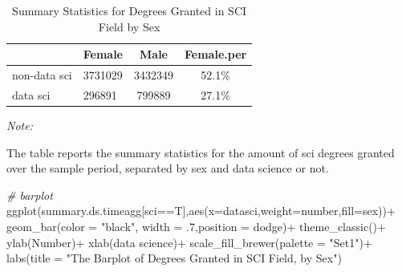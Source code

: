 \documentclass[
  12pt,
]{article}
\newenvironment{Shaded}{\begin{snugshade}}{\end{snugshade}}
\newcommand{\AttributeTok}[1]{\textcolor[rgb]{0.77,0.63,0.00}{#1}}
\newcommand{\CommentTok}[1]{\textcolor[rgb]{0.56,0.35,0.01}{\textit{#1}}}
\newcommand{\DecValTok}[1]{\textcolor[rgb]{0.00,0.00,0.81}{#1}}
\newcommand{\FunctionTok}[1]{\textcolor[rgb]{0.00,0.00,0.00}{#1}}
\newcommand{\NormalTok}[1]{#1}
\newcommand{\SpecialCharTok}[1]{\textcolor[rgb]{0.00,0.00,0.00}{#1}}
\newcommand{\StringTok}[1]{\textcolor[rgb]{0.31,0.60,0.02}{#1}}
\begin{document}
\begin{table}[H]

\caption{\label{tab:unnamed-chunk-11}Summary Statistics for Degrees Granted in SCI Field by Sex}
\centering
\begin{threeparttable}
\begin{tabular}[t]{llcc}
\toprule
  & Female & Male & Female.per\\
\midrule
non-data sci & 3731029 & 3432349 & 52.1\%\\
data sci & 296891 & 799889 & 27.1\%\\
\bottomrule
\end{tabular}
\begin{tablenotes}
\item \textit{Note: } 
\item The table reports the summary statistics for the amount of sci degrees granted over the sample period, separated by sex and data science or not.
\end{tablenotes}
\end{threeparttable}
\end{table}

\begin{Shaded}
\begin{Highlighting}[]
\CommentTok{\# barplot}
\FunctionTok{ggplot}\NormalTok{(summary.ds.timeagg[sci}\SpecialCharTok{==}\NormalTok{T],}\FunctionTok{aes}\NormalTok{(}\AttributeTok{x=}\NormalTok{datasci,}\AttributeTok{weight=}\NormalTok{number,}\AttributeTok{fill=}\NormalTok{sex))}\SpecialCharTok{+}
  \FunctionTok{geom\_bar}\NormalTok{(}\AttributeTok{color =} \StringTok{"black"}\NormalTok{, }\AttributeTok{width =}\NormalTok{ .}\DecValTok{7}\NormalTok{,}\AttributeTok{position =} \StringTok{\textquotesingle{}dodge\textquotesingle{}}\NormalTok{)}\SpecialCharTok{+}
  \FunctionTok{theme\_classic}\NormalTok{()}\SpecialCharTok{+}
  \FunctionTok{ylab}\NormalTok{(}\StringTok{\textquotesingle{}Number\textquotesingle{}}\NormalTok{)}\SpecialCharTok{+}
  \FunctionTok{xlab}\NormalTok{(}\StringTok{\textquotesingle{}data science\textquotesingle{}}\NormalTok{)}\SpecialCharTok{+}
  \FunctionTok{scale\_fill\_brewer}\NormalTok{(}\AttributeTok{palette =} \StringTok{"Set1"}\NormalTok{)}\SpecialCharTok{+}
  \FunctionTok{labs}\NormalTok{(}\AttributeTok{title =} \StringTok{"The Barplot of Degrees Granted in SCI Field, by Sex"}\NormalTok{)}
\end{Highlighting}
\end{Shaded}
\end{document}
